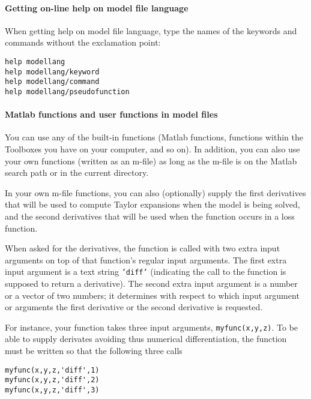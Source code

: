 \paragraph{Getting on-line help on model file
language}\label{getting-on-line-help-on-model-file-language}

When getting help on model file language, type the names of the keywords
and commands without the exclamation point:

\begin{verbatim}
help modellang
help modellang/keyword
help modellang/command 
help modellang/pseudofunction
\end{verbatim}

\paragraph{Matlab functions and user functions in model
files}\label{matlab-functions-and-user-functions-in-model-files}

You can use any of the built-in functions (Matlab functions, functions
within the Toolboxes you have on your computer, and so on). In addition,
you can also use your own functions (written as an m-file) as long as
the m-file is on the Matlab search path or in the current directory.

In your own m-file functions, you can also (optionally) supply the first
derivatives that will be used to compute Taylor expansions when the
model is being solved, and the second derivatives that will be used when
the function occurs in a loss function.

When asked for the derivatives, the function is called with two extra
input arguments on top of that function's regular input arguments. The
first extra input argument is a text string \texttt{'diff'} (indicating
the call to the function is supposed to return a derivative). The second
extra input argument is a number or a vector of two numbers; it
determines with respect to which input argument or arguments the first
derivative or the second derivative is requested.

For instance, your function takes three input arguments,
\texttt{myfunc(x,y,z)}. To be able to supply derivates avoiding thus
numerical differentiation, the function must be written so that the
following three calls

\begin{verbatim}
myfunc(x,y,z,'diff',1)
myfunc(x,y,z,'diff',2)
myfunc(x,y,z,'diff',3)
\end{verbatim}

